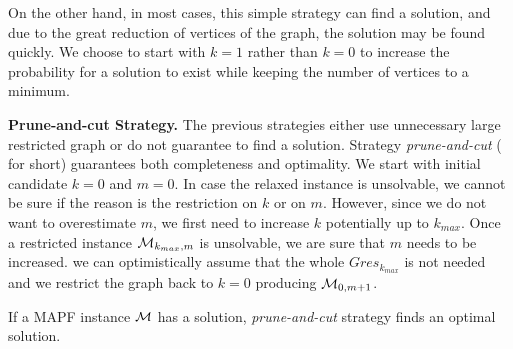 On the other hand, in most cases, this simple strategy can find a solution, and due to the great reduction of vertices of the graph, the solution may be found quickly. We choose to start with $k=1$ rather than $k=0$ to increase the probability for a solution to exist while keeping the number of vertices to a minimum.



\textbf{Prune-and-cut Strategy.}
%
The previous strategies either use unnecessary large restricted graph or do not guarantee to find a solution. Strategy \emph{prune-and-cut} (\ssp{} for short) guarantees both completeness and optimality. We start with initial candidate $k=0$ and $m=0$. In case the relaxed instance is unsolvable, we cannot be sure if the reason is the restriction on $k$ or on $m$. However, since we do not want to overestimate $m$, we first need to increase $k$ potentially up to $k_{max}$. Once a restricted instance ${\mathcal{M}}_{k_{max},m}$ is unsolvable, we are sure that $m$ needs to be increased. %
we can optimistically assume that the whole $Gres_{k_{max}}$ is not needed and we restrict the graph back to $k=0$ producing ${\mathcal{M}}_{0,m+1}$.


\begin{prop}
If a MAPF instance $\mathcal{M}$ has a solution, \emph{prune-and-cut} strategy finds an optimal solution.~\cite{AAMAS_corridors}
\end{prop}





